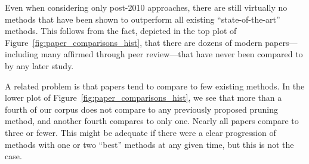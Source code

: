 Even when considering only post-2010 approaches, there are still virtually no methods that have been shown to outperform all existing ``state-of-the-art'' methods. This follows from the fact, depicted in the top plot of Figure~\ref{fig:paper_comparisons_hist}, that there are dozens of modern papers---including many affirmed through peer review---that have never been compared to by any later study.

A related problem is that papers tend to compare to few existing methods. In the lower plot of Figure~\ref{fig:paper_comparisons_hist}, we see that more than a fourth of our corpus does not compare to any previously proposed pruning method, and another fourth compares to only one. Nearly all papers compare to three or fewer. This might be adequate if there were a clear progression of methods with one or two ``best'' methods at any given time, but this is not the case. %



